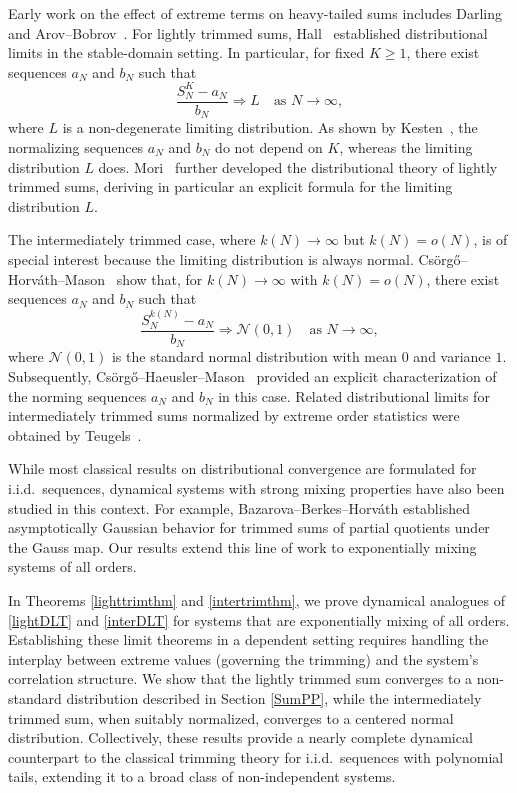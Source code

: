 \documentclass[11pt,twoside,a4paper,reqno]{amsart}
\newcommand{\as}[1]{\text{as } #1 \rightarrow\infty}
\begin{document}
Early work on the effect of extreme terms on heavy-tailed sums includes Darling~\cite{Dar52} and Arov--Bobrov~\cite{AB60}. For lightly trimmed sums, Hall~\cite{Hal78} established distributional limits in the stable-domain setting. In particular, for fixed $K\geq 1$, there exist sequences $a_N$ and $b_N$ such that
\begin{equation}\label{lightDLT}
\frac{S_N^K-a_N}{b_N} \Rightarrow L \quad \text{as } N \to \infty,
\end{equation}
where $L$ is a non-degenerate limiting distribution. As shown by Kesten~\cite{kestenweak}, the normalizing sequences $a_N$ and $b_N$ do not depend on $K$, whereas the limiting distribution $L$ does. Mori~\cite{Mori84} further developed the distributional theory of lightly trimmed sums, deriving in particular an explicit formula for the limiting distribution $L$.




The intermediately trimmed case, where $k(N)\rightarrow\infty$ but $k(N)=o(N)$, is of special interest because the limiting distribution is always normal. Cs\"{o}rg\H{o}--Horv\'{a}th--Mason~\cite{CHMinter} show that, for $k(N)\rightarrow\infty$ with $k(N)=o(N)$, there exist sequences $a_N$ and $b_N$ such that
\begin{equation}\label{interDLT}
\frac{S_N^{k(N)} - a_N}{b_N} \Rightarrow \mathcal{N}(0,1) \quad \as{N},
\end{equation}
where $\mathcal{N}(0,1)$ is the standard normal distribution with mean $0$ and variance $1$. Subsequently, Cs\"{o}rg\H{o}--Haeusler--Mason~\cite{CHMdesc} provided an explicit characterization of the norming sequences $a_N$ and $b_N$ in this case. Related distributional limits for intermediately trimmed sums normalized by extreme order statistics were obtained by Teugels~\cite{Teu81}.



While most classical results on distributional convergence are formulated for i.i.d.\ sequences, dynamical systems with strong mixing properties have also been studied in this context. For example, Bazarova--Berkes--Horv\'{a}th \cite{BBH16} established asymptotically Gaussian behavior for trimmed sums of partial quotients under the Gauss map. Our results extend this line of work to exponentially mixing systems of all orders.





In Theorems \ref{lighttrimthm} and \ref{intertrimthm}, we prove dynamical analogues of \eqref{lightDLT} and \eqref{interDLT} for systems that are exponentially mixing of all orders. Establishing these limit theorems in a dependent setting requires handling the interplay between extreme values (governing the trimming) and the system's correlation structure. We show that the lightly trimmed sum converges to a non-standard distribution described in Section \ref{SumPP}, while the intermediately trimmed sum, when suitably normalized, converges to a centered normal distribution. Collectively, these results provide a nearly complete dynamical counterpart to the classical trimming theory for i.i.d.\ sequences with polynomial tails, extending it to a broad class of non-independent systems.
\end{document}
